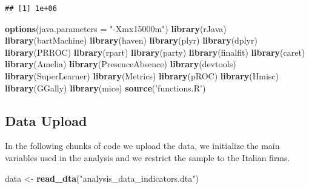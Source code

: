 \documentclass[]{article}
\newenvironment{Shaded}{\begin{snugshade}}{\end{snugshade}}
\newcommand{\DataTypeTok}[1]{\textcolor[rgb]{0.13,0.29,0.53}{#1}}
\newcommand{\KeywordTok}[1]{\textcolor[rgb]{0.13,0.29,0.53}{\textbf{#1}}}
\newcommand{\NormalTok}[1]{#1}
\newcommand{\StringTok}[1]{\textcolor[rgb]{0.31,0.60,0.02}{#1}}
\begin{document}
\begin{verbatim}
## [1] 1e+06
\end{verbatim}

\begin{Shaded}
\begin{Highlighting}[]
\KeywordTok{options}\NormalTok{(}\DataTypeTok{java.parameters =} \StringTok{"-Xmx15000m"}\NormalTok{)}
\KeywordTok{library}\NormalTok{(rJava)}
\KeywordTok{library}\NormalTok{(bartMachine)}
\KeywordTok{library}\NormalTok{(haven)}
\KeywordTok{library}\NormalTok{(plyr)}
\KeywordTok{library}\NormalTok{(dplyr)}
\KeywordTok{library}\NormalTok{(PRROC)}
\KeywordTok{library}\NormalTok{(rpart)}
\KeywordTok{library}\NormalTok{(party)}
\KeywordTok{library}\NormalTok{(finalfit)}
\KeywordTok{library}\NormalTok{(caret)}
\KeywordTok{library}\NormalTok{(Amelia)}
\KeywordTok{library}\NormalTok{(PresenceAbsence)}
\KeywordTok{library}\NormalTok{(devtools)}
\KeywordTok{library}\NormalTok{(SuperLearner)}
\KeywordTok{library}\NormalTok{(Metrics)}
\KeywordTok{library}\NormalTok{(pROC)}
\KeywordTok{library}\NormalTok{(Hmisc)}
\KeywordTok{library}\NormalTok{(GGally)}
\KeywordTok{library}\NormalTok{(mice)}
\KeywordTok{source}\NormalTok{(}\StringTok{'functions.R'}\NormalTok{)}
\end{Highlighting}
\end{Shaded}

\hypertarget{data-upload}{%
\subsection{Data Upload}\label{data-upload}}

In the following chunks of code we upload the data, we initialize the
main variables used in the analysis and we restrict the sample to the
Italian firms.

\begin{Shaded}
\begin{Highlighting}[]
\NormalTok{data <-}\StringTok{ }\KeywordTok{read_dta}\NormalTok{(}\StringTok{"analysis_data_indicators.dta"}\NormalTok{)}
\end{Highlighting}
\end{Shaded}
\end{document}
